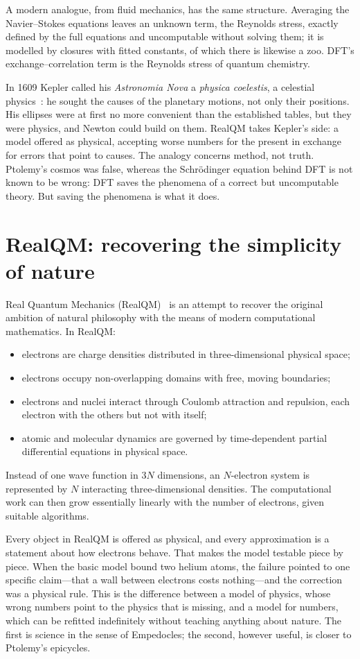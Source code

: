 \documentclass[11pt]{article}
\begin{document}
A modern analogue, from fluid mechanics, has the same structure. Averaging the Navier--Stokes equations
leaves an unknown term, the Reynolds stress, exactly defined by the full equations and uncomputable
without solving them; it is modelled by closures with fitted constants, of which there is likewise a
zoo. DFT's exchange--correlation term is the Reynolds stress of quantum chemistry.

In 1609 Kepler called his \emph{Astronomia Nova} a \emph{physica coelestis}, a celestial
physics~\cite{kepler}: he sought the causes of the planetary motions, not only their positions. His
ellipses were at first no more convenient than the established tables, but they were physics, and Newton
could build on them. RealQM takes Kepler's side: a model offered as physical, accepting worse numbers for
the present in exchange for errors that point to causes. The analogy concerns method, not truth.
Ptolemy's cosmos was false, whereas the Schr\"odinger equation behind DFT is not known to be wrong: DFT
saves the phenomena of a correct but uncomputable theory. But saving the phenomena is what it does.

\section{RealQM: recovering the simplicity of nature}

Real Quantum Mechanics (RealQM)~\cite{realqm} is an attempt to recover the original ambition of natural philosophy
with the means of modern computational mathematics. In RealQM:
\begin{itemize}
\item electrons are charge densities distributed in three-dimensional physical space;
\item electrons occupy non-overlapping domains with free, moving boundaries;
\item electrons and nuclei interact through Coulomb attraction and repulsion, each electron with the
others but not with itself;
\item atomic and molecular dynamics are governed by time-dependent partial differential equations in
physical space.
\end{itemize}
Instead of one wave function in $3N$ dimensions, an $N$-electron system is represented by $N$ interacting
three-dimensional densities. The computational work can then grow essentially linearly with the number
of electrons, given suitable algorithms.

Every object in RealQM is offered as physical, and every approximation is a statement about how
electrons behave. That makes the model testable piece by piece. When the basic model bound two helium
atoms, the failure pointed to one specific claim---that a wall between electrons costs nothing---and the
correction was a physical rule. This is the difference between a model of physics, whose wrong numbers
point to the physics that is missing, and a model for numbers, which can be refitted indefinitely without
teaching anything about nature. The first is science in the sense of Empedocles; the second, however
useful, is closer to Ptolemy's epicycles.
\end{document}
